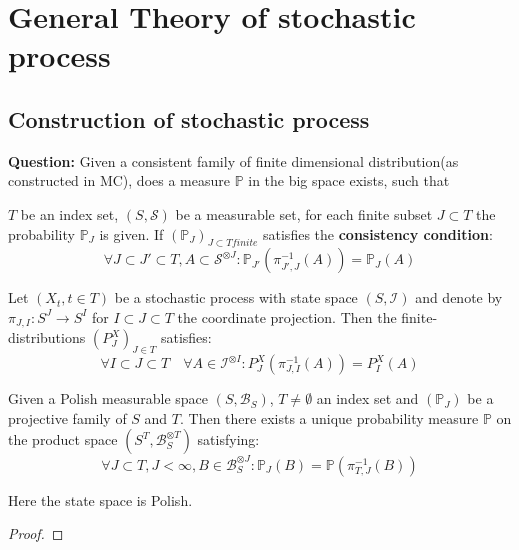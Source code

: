 \newpage
\section{General Theory of stochastic process}

\subsection{Construction of stochastic process}

\textbf{Question:} Given a consistent family of finite dimensional distribution(as constructed in MC), does a measure $\mathbb{P}$ in the big space exists, such that
\begin{definition}
$T$ be an index set, $(S, \mathcal{S})$ be a measurable set, for each finite subset $J \subset T$ the probability $\mathbb{P}_J$ is given. If $(\mathbb{P}_J)_{J \subset T finite}$ satisfies the \textbf{consistency condition}:
\begin{equation*}
	\forall J \subset J' \subset T, A \subset \mathcal{S}^{\otimes J}: \mathbb{P}_{J'}(\pi_{J', J}^{-1}(A)) = \mathbb{P}_J(A)
\end{equation*}
\end{definition}

\begin{lemma}
	Let $(X_t, t \in T)$ be a stochastic process with state space $(S, \mathcal{I})$ and denote by $\pi_{J, I}: S^J \rightarrow S^I$ for $I \subset J \subset T$ the coordinate projection. Then the finite-distributions $(P_J^X)_{J\in T}$ satisfies:
	\begin{equation*}
		\forall I \subset J \subset T \quad \forall A \in \mathcal{I}^{\otimes I}: P^X_J(\pi_{J, I}^{-1}(A)) = P_I^X(A)
	\end{equation*}
\end{lemma}



\begin{theorem}
	Given a Polish measurable space $(S, \mathcal{B}_S)$, $T \neq \emptyset$ an index set and $(\mathbb{P}_J)$ be a projective family of $S$ and $T$. Then there exists a unique probability measure $\mathbb{P}$ on the product space $(S^T, \mathcal{B}^{\otimes T}_S)$ satisfying:
	\begin{equation*}
		\forall J \subset T, J < \infty, B \in \mathcal{B}^{\otimes J}_S: \mathbb{P}_J(B) = \mathbb{P}(\pi_{T, J}^{-1}(B))
	\end{equation*}
\end{theorem}
\begin{remark}
	Here the state space is Polish.
\end{remark}
\begin{proof}
\end{proof}

